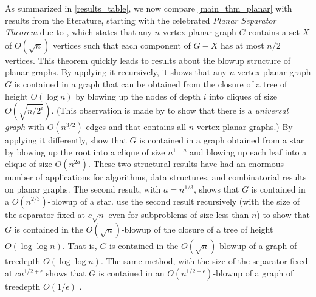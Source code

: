 \documentclass{patmorin}
\newcommand{\defin}[1]{\emph{\textcolor{brightmaroon}{#1}}}
\begin{document}
As summarized in \cref{results_table}, we now compare \cref{main_thm_planar} with results from the literature, starting with the celebrated \defin{Planar Separator Theorem} due to \citet{lipton.tarjan:separator}, which states that any $n$-vertex planar graph $G$ contains a set $X$ of $O(\sqrt{n})$ vertices such that each component of $G-X$ has at most $n/2$ vertices. This theorem quickly leads to results about the blowup structure of planar graphs.  By applying it recursively, it shows that any $n$-vertex planar graph $G$ is contained in a graph that can be obtained from the closure of a 
tree of height $O(\log n)$ by blowing up the nodes of depth $i$ into cliques of size $O(\sqrt{n/2^i})$.  (This observation is made by \citet{babai.chung.ea:on} to show that there is a \defin{universal graph} with $O(n^{3/2})$ edges and that contains all $n$-vertex planar graphs.)
By applying it differently, \citet{lipton.tarjan:applications} show that $G$ is contained in a graph obtained from a star by blowing up the root into a clique of size $n^{1-a}$ and blowing up each leaf into a clique of size $O(n^{2a})$. These two structural results have had an enormous number of applications for algorithms, data structures, and combinatorial results on planar graphs. The second result, with $a=n^{1/3}$, shows that $G$ is contained in a $O(n^{2/3})$-blowup of a star. \citet{dvowoo} use the second result recursively (with the size of the separator fixed at $c\sqrt{n}$ even for subproblems of size less than $n$) to show that $G$ is contained in the $O(\sqrt{n})$-blowup of the closure of a tree of height $O(\log\log n)$. That is, $G$ is contained in the $O(\sqrt{n})$-blowup of a graph of treedepth $O(\log\log n)$.  The same method, with the size of the separator fixed at $cn^{1/2+\epsilon}$ shows that $G$ is contained in an $O(n^{1/2+\epsilon})$-blowup of a graph of treedepth $O(1/\epsilon)$ \cite{dvowoo}.
\end{document}
